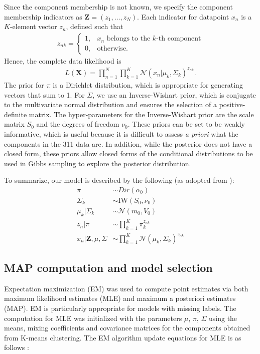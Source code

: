 \documentclass[twoside]{article}
\newcommand{\N}{\mathcal{N}}
\theoremstyle{theorem}
\theoremstyle{theorem}
\theoremstyle{theorem}
\theoremstyle{lemma}
\theoremstyle{definition}
\theoremstyle{example}
\begin{document}
Since the component membership is not known, we specify the component membership indicators as $\mathbf{Z} = (z_1, \ldots, z_N)$. Each indicator for datapoint $x_n$ is a $K$-element vector $z_n$, defined such that \begin{align}
z_{nk} = \begin{cases}
1, & x_n\text{ belongs to the $k$-th component}\\
0, & \text{otherwise}. 
\end{cases}
\end{align}
Hence, the complete data likelihood is 
\begin{align}
L(\mathbf{X}) = \prod_{n=1}^N\prod_{k=1}^K \N(x_n| \mu_k, \Sigma_k)^{z_{nk}}.
\end{align}
The prior for $\pi$ is a Dirichlet distribution, which is appropriate for generating vectors that sum to 1. For $\Sigma$, we use an Inverse-Wishart prior, which is conjugate to the multivariate normal distribution and ensures the selection of a positive-definite matrix. The hyper-parameters for the Inverse-Wishart prior are the scale matrix $S_0$ and the degrees of freedom $\nu_0$.  These priors can be set to be weakly informative, which is useful because it is difficult to assess \textit{a priori} what the components in the 311 data are. In addition, while the posterior does not have a closed form, these priors allow closed forms of the conditional distributions to be used in Gibbs sampling to explore the posterior distribution. 

To summarize, our model is described by the following (as adopted from \cite{Gelman, Jones}): 
\begin{align}
\pi &\sim Dir(\alpha_0)\\
\Sigma_k &\sim \mathrm{IW}(S_0, \nu_0)\\
\mu_k | \Sigma_k &\sim \N(m_0, V_0)\\
z_n | \pi &\sim \prod_{k=1}^K \pi_k^{z_{nk}}\\
x_n | \mathbf{Z}, \mu, \Sigma &\sim \prod_{k=1}^K \N(\mu_k, \Sigma_k)^{z_{nk}}
\end{align}

\subsection{MAP computation and model selection}
Expectation maximization (EM) was used to compute point estimates via both maximum likelihood estimates (MLE) and maximum a posteriori estimates (MAP). EM is particularly appropriate for models with missing labels. The computation for MLE was initialized with the parameters $\mu$, $\pi$, $\Sigma$ using the means, mixing coefficients and covariance matrices for the components obtained from K-means clustering. The EM algorithm update equations for MLE is as follows \cite{Bishop}: 
\end{document}
